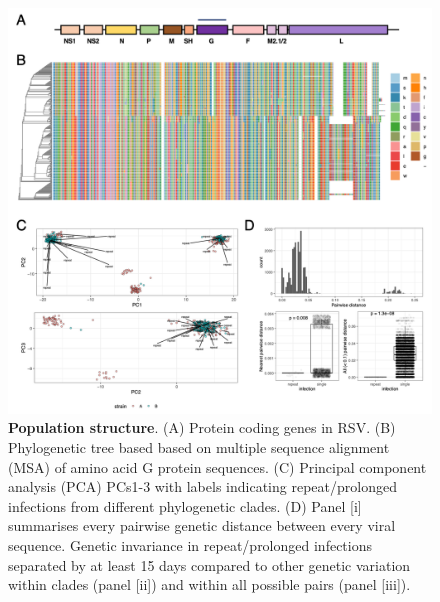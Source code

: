 \documentclass{article} %
\begin{document}
\begin{figure}[ht] \hspace{-0.5cm} 
    \includegraphics[scale=0.8]{f2}
	\caption{\textbf{Population structure}.
(A) Protein coding genes in RSV.
(B) Phylogenetic tree based based on multiple sequence alignment (MSA) of amino acid G protein sequences.
(C) Principal component analysis (PCA) PCs1-3 with labels indicating repeat/prolonged infections from different phylogenetic clades.
(D) Panel [i] summarises every pairwise genetic distance between every viral sequence.
Genetic invariance in repeat/prolonged infections separated by at least 15 days compared to other genetic variation within clades  
(panel [ii]) and within all possible pairs (panel [iii]).}
	\label{fig:2} 
\end{figure}
\clearpage
\end{document}

